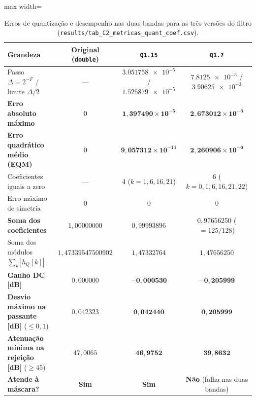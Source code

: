 \documentclass[11pt,a4paper]{article}
\newcommand{\MetricaCErroMaxQXV}{1{,}397490\times 10^{-5}}
\newcommand{\MetricaCEQMQXV}{9{,}057312\times 10^{-11}}
\newcommand{\MetricaCSomaQXV}{0{,}99993896}
\newcommand{\MetricaCGanhoDCQXVdB}{-0{,}000530}
\newcommand{\MetricaCDesvioPassQXVdB}{0{,}042440}
\newcommand{\MetricaCAtenStopQXVdB}{46{,}9752}
\newcommand{\MetricaCErroMaxQVII}{2{,}673012\times 10^{-3}}
\newcommand{\MetricaCEQMQVII}{2{,}260906\times 10^{-6}}
\newcommand{\MetricaCSomaQVII}{0{,}97656250}
\newcommand{\MetricaCGanhoDCQVIIdB}{-0{,}205999}
\newcommand{\MetricaCDesvioPassQVIIdB}{0{,}205999}
\newcommand{\MetricaCAtenStopQVIIdB}{39{,}8632}
\newcommand{\MetricaENormaLI}{1{,}47339547500902}
\newcommand{\MetricaCSomaAbsQXV}{1{,}47332764}
\newcommand{\MetricaCSomaAbsQVII}{1{,}47656250}
\begin{document}
\begin{table}[H]
    \centering
    \caption{Erros de quantização e desempenho nas duas bandas para as três versões do filtro (\texttt{results/tab\_C2\_metricas\_quant\_coef.csv}).}
    \label{tab:C2_metricas}
    \small
    \setlength{\tabcolsep}{5pt}
    \begin{adjustbox}{max width=\textwidth}
    \begin{tabular}{@{}lccc@{}}
        \toprule
        \textbf{Grandeza} & \textbf{Original (\texttt{double})} & \textbf{\texttt{Q1.15}} & \textbf{\texttt{Q1.7}} \\
        \midrule
        Passo $\Delta = 2^{-F}$ / limite $\Delta/2$ & --- & $\num{3,051758e-5}$ / $\num{1,525879e-5}$ & $\num{7,8125e-3}$ / $\num{3,90625e-3}$ \\
        \textbf{Erro absoluto máximo} & $0$ & $\mathbf{\MetricaCErroMaxQXV}$ & $\mathbf{\MetricaCErroMaxQVII}$ \\
        \textbf{Erro quadrático médio (EQM)} & $0$ & $\mathbf{\MetricaCEQMQXV}$ & $\mathbf{\MetricaCEQMQVII}$ \\
        Coeficientes iguais a zero & --- & 4 ($k = 1, 6, 16, 21$) & 6 ($k = 0, 1, 6, 16, 21, 22$) \\
        Erro máximo de simetria & $0$ & $0$ & $0$ \\
        \textbf{Soma dos coeficientes} & $1,00000000$ & $\MetricaCSomaQXV$ & $\MetricaCSomaQVII$ ($= 125/128$) \\
        Soma dos módulos $\sum_k |h_Q[k]|$ & $\MetricaENormaLI$ & $\MetricaCSomaAbsQXV$ & $\MetricaCSomaAbsQVII$ \\
        \textbf{Ganho DC [\si{dB}]} & $0,000000$ & $\mathbf{\MetricaCGanhoDCQXVdB}$ & $\mathbf{\MetricaCGanhoDCQVIIdB}$ \\
        \textbf{Desvio máximo na passante [\si{dB}]} ($\le 0,1$) & $0,042323$ & $\mathbf{\MetricaCDesvioPassQXVdB}$ & $\mathbf{\MetricaCDesvioPassQVIIdB}$ \\
        \textbf{Atenuação mínima na rejeição [\si{dB}]} ($\ge 45$) & $47,0065$ & $\mathbf{\MetricaCAtenStopQXVdB}$ & $\mathbf{\MetricaCAtenStopQVIIdB}$ \\
        \textbf{Atende à máscara?} & \textbf{Sim} & \textbf{Sim} & \textbf{Não} (falha nas duas bandas) \\
        \bottomrule
    \end{tabular}
    \end{adjustbox}
\end{table}
\end{document}
